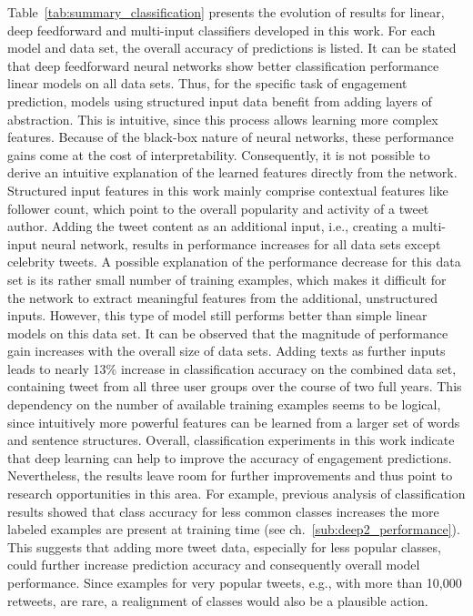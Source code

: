 Table~\ref{tab:summary_classification} presents the evolution of results for linear,
deep feedforward and multi-input classifiers developed in this work.
For each model and data set, the overall accuracy of predictions is listed.
It can be stated that deep feedforward neural networks show better classification
performance linear models on all data sets.
Thus, for the specific task of engagement prediction, models using structured
input data benefit from adding layers of abstraction.
This is intuitive, since this process allows learning more complex features.
Because of the black-box nature of neural networks, these performance gains
come at the cost of interpretability.
Consequently, it is not possible to derive an intuitive explanation of the learned
features directly from the network.
Structured input features in this work mainly comprise contextual features like
follower count, which point to the overall popularity and activity of a tweet
author.
Adding the tweet content as an additional input, i.e., creating a multi-input
neural network, results in performance increases for all data sets except
celebrity tweets.
A possible explanation of the performance decrease for this data set is its rather small number of
training examples, which makes it difficult for the network to extract meaningful
features from the additional, unstructured inputs.
However, this type of model still performs better than simple linear models
on this data set.
It can be observed that the magnitude of performance gain increases with the
overall size of data sets.
Adding texts as further inputs leads to nearly 13\% increase in classification
accuracy on the combined data set, containing tweet from all three user groups
over the course of two full years.
This dependency on the number of available training examples seems to be logical,
since intuitively more powerful features can be learned from a larger set of words and
sentence structures.
Overall, classification experiments in this work indicate that
deep learning can help to improve the accuracy of engagement predictions.
Nevertheless, the results leave room for further improvements and thus point
to research opportunities in this area.
For example, previous analysis of classification results showed that class accuracy for less
common classes increases the more labeled examples are present at training time (see ch.~\ref{sub:deep2_performance}).
This suggests that adding more tweet data, especially for less popular classes,
could further increase prediction accuracy and consequently overall model performance.
Since examples for very popular tweets, e.g., with more than 10,000 retweets, are
rare, a realignment of classes would also be a plausible action.

